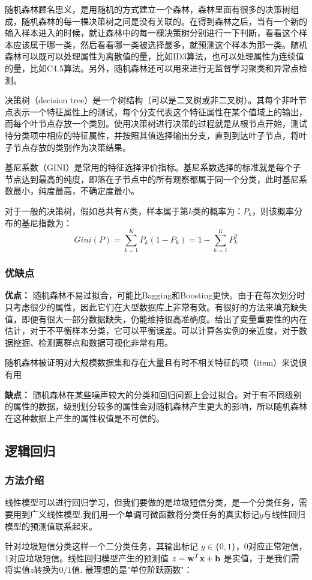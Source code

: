 \documentclass[a4paper]{article}
\begin{document}
随机森林顾名思义，是用随机的方式建立一个森林，森林里面有很多的决策树组成，随机森林的每一棵决策树之间是没有关联的。在得到森林之后，当有一个新的输入样本进入的时候，就让森林中的每一棵决策树分别进行一下判断，看看这个样本应该属于哪一类，然后看看哪一类被选择最多，就预测这个样本为那一类。随机森林可以既可以处理属性为离散值的量，比如ID3算法，也可以处理属性为连续值的量，比如C4.5算法。另外，随机森林还可以用来进行无监督学习聚类和异常点检测。

决策树（decision tree）是一个树结构（可以是二叉树或非二叉树）。其每个非叶节点表示一个特征属性上的测试，每个分支代表这个特征属性在某个值域上的输出，而每个叶节点存放一个类别。使用决策树进行决策的过程就是从根节点开始，测试待分类项中相应的特征属性，并按照其值选择输出分支，直到到达叶子节点，将叶子节点存放的类别作为决策结果。

基尼系数（GINI）是常用的特征选择评价指标。基尼系数选择的标准就是每个子节点达到最高的纯度，即落在子节点中的所有观察都属于同一个分类，此时基尼系数最小，纯度最高，不确定度最小。

对于一般的决策树，假如总共有$K$类，样本属于第$k$类的概率为：$P_k$，则该概率分布的基尼指数为：
\begin{equation}\label{gini}
	Gini(P)=\sum_{k=1}^KP_k(1-P_k)=1-\sum_{k=1}^KP_k^2
\end{equation}

\subsubsection{优缺点}
\textbf{优点：}
随机森林不易过拟合，可能比Bagging和Boosting更快。由于在每次划分时只考虑很少的属性，因此它们在大型数据库上非常有效。有很好的方法来填充缺失值，即便有很大一部分数据缺失，仍能维持很高准确度。给出了变量重要性的内在估计，对于不平衡样本分类，它可以平衡误差。可以计算各实例的亲近度，对于数据挖掘、检测离群点和数据可视化非常有用。

随机森林被证明对大规模数据集和存在大量且有时不相关特征的项（item）来说很有用

\textbf{缺点：}
随机森林在某些噪声较大的分类和回归问题上会过拟合。对于有不同级别的属性的数据，级别划分较多的属性会对随机森林产生更大的影响，所以随机森林在这种数据上产生的属性权值是不可信的。


\subsection{逻辑回归}
\subsubsection{方法介绍}
线性模型可以进行回归学习，但我们要做的是垃圾短信分类，是一个分类任务，需要用到广义线性模型.我们用一个单调可微函数将分类任务的真实标记$y$与线性回归模型的预测值联系起来。
\par
针对垃圾短信分类这样一个二分类任务，其输出标记 $y\in\{0,1\}$，0对应正常短信，1对应垃圾短信。线性回归模型产生的预测值 $z = {\bf w}^T{\bf x}+{\bf b}$ 是实值，于是我们需将实值$z$转换为$0/1$值. 最理想的是"单位阶跃函数"：
\end{document}
